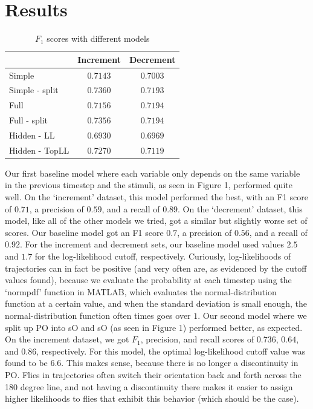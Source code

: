 \documentclass{article} %
\begin{document}
\section{Results}
\begin{table}[t]
\caption{$F_1$ scores with different models}
\begin{center}
\begin{tabular}{l|c|c|}
 & Increment & Decrement \\ \hline
 Simple & $0.7143$ & $0.7003$ \\
 Simple - split & $0.7360$ & $ 0.7193$ \\
 Full & $0.7156$ & $0.7194$ \\
 Full - split & $0.7356$ & $0.7194$ \\
 Hidden - LL & $0.6930$ & $0.6969$ \\
 Hidden - TopLL & $0.7270$ & $0.7119$
\end{tabular}
\end{center}
\end{table}
Our first baseline model where each variable only depends on the same variable in the previous timestep and the stimuli, as seen in Figure 1, performed quite well. On the `increment’ dataset, this model performed the best, with an F1 score of $0.71$, a precision of $0.59$, and a recall of $0.89$. On the ‘decrement’ dataset, this model, like all of the other models we tried, got a similar but slightly worse set of scores. Our baseline model got an F1 score $0.7$, a precision of $0.56$, and a recall of $0.92$. For the increment and decrement sets, our baseline model used values $2.5$ and $1.7$ for the log-likelihood cutoff, respectively. Curiously, log-likelihoods of trajectories can in fact be positive (and very often are, as evidenced by the cutoff values found), because we evaluate the probability at each timestep using the `normpdf’ function in MATLAB, which evaluates the normal-distribution function at a certain value, and when the standard deviation is small enough, the normal-distribution function often times goes over $1$.
Our second model where we split up PO into sO and sO (as seen in Figure 1) performed better, as expected. On the increment dataset, we got $F_1$, precision, and recall scores of $0.736$, $0.64$, and $0.86$, respectively. For this model, the optimal log-likelihood cutoff value was found to be 6.6. This makes sense, because there is no longer a discontinuity in PO. Flies in trajectories often switch their orientation back and forth across the 180 degree line, and not having a discontinuity there makes it easier to assign higher likelihoods to flies that exhibit this behavior (which should be the case).
\end{document}
